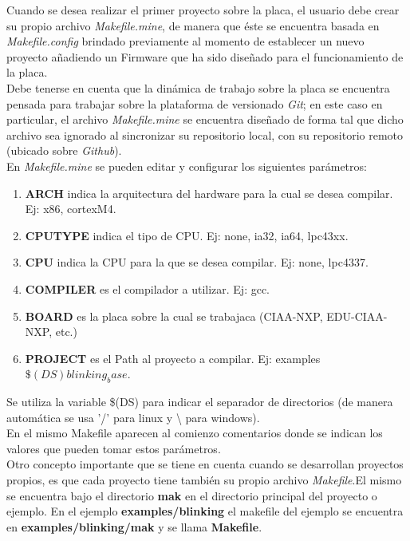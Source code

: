 \documentclass[12pt,letterpaper]{article}
\begin{document}
Cuando se desea realizar el primer proyecto sobre la placa, el usuario debe crear su propio archivo \textit{Makefile.mine}, de manera que éste se encuentra basada en \textit{Makefile.config} brindado previamente al momento de establecer un nuevo proyecto añadiendo un Firmware que ha sido diseñado para el funcionamiento de la placa.
 \\
 
Debe tenerse en cuenta que la dinámica de trabajo sobre la placa se encuentra pensada para trabajar sobre la plataforma de versionado \textit{Git}; en este caso en particular, el archivo \textit{Makefile.mine} se encuentra diseñado de forma tal que dicho archivo sea ignorado al sincronizar su repositorio local, con su repositorio remoto (ubicado sobre \textit{Github}).
 \\
 
En \textit{Makefile.mine} se pueden editar y configurar los siguientes parámetros\cite{parametrosdelmakefile}:
\begin{enumerate}
\item \textbf{ARCH}  indica la arquitectura del hardware para la cual se desea compilar. Ej: x86, cortexM4.
\item \textbf{CPUTYPE} indica el tipo de CPU. Ej: none, ia32, ia64, lpc43xx.
\item \textbf{CPU} indica la CPU para la que se desea compilar. Ej: none, lpc4337.
\item \textbf{COMPILER }es el compilador a utilizar. Ej: gcc.
\item \textbf{BOARD }es la placa sobre la cual se trabajaca (CIAA-NXP, EDU-CIAA-NXP, etc.)
\item \textbf{PROJECT }es el Path al proyecto a compilar. Ej: examples$\$(DS)blinking_base$.
\end{enumerate}
Se utiliza la variable \$(DS) para indicar el separador de directorios (de manera automática se usa '/' para linux y \textbackslash{} para windows).
 \\
 
En el mismo Makefile aparecen al comienzo comentarios donde se indican los valores que pueden tomar estos parámetros.
 \\
 
Otro concepto importante que se tiene en cuenta cuando se desarrollan proyectos propios, es que cada proyecto tiene también su propio archivo \textit{Makefile}.El mismo se encuentra bajo el directorio \textbf{mak} en el directorio principal del proyecto o ejemplo. En el ejemplo \textbf{examples/blinking} el makefile del ejemplo se encuentra en \textbf{examples/blinking/mak} y se llama \textbf{Makefile}.
 \\
 
\end{document}
